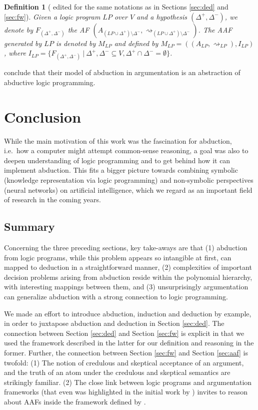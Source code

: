 \documentclass[a4paper]{article}
\newcommand{\attacks}{\rightsquigarrow}
\newtheorem{definition}{Definition}
\begin{document}
\begin{definition}[{\cite[Definition 16]{DBLP:conf/ecai/BoothGKRT14} edited for the same notations as in Sections \ref{sec:ded} and \ref{sec:fw}}]
Given a logic program $LP$ over $V$ and a hypothesis $(\Delta^+, \Delta^-)$, we denote by $F_{(\Delta^+, \Delta^-)}$ the AF $(A_{(LP \cup \Delta^+) \setminus \Delta^-}, \attacks_{(LP \cup \Delta^+) \setminus \Delta^-})$. The AAF \emph{generated by} $LP$ is denoted by $M_{LP}$ and defined by $M_{LP} = ((A_{LP}, \attacks_{LP}), I_{LP})$, where $I_{LP} = \{ F_{(\Delta^+, \Delta^-)} \ | \ \Delta^+, \Delta^- \subseteq V, \Delta^+ \cap \Delta^- = \emptyset \}$.
\end{definition}

\citet{DBLP:conf/ecai/BoothGKRT14} conclude that their model of abduction in argumentation is an abstraction of abductive logic programming.

\section{Conclusion}
\label{sec:con}

While the main motivation of this work was the fascination for abduction, i.e.~how a computer might attempt common-sense reasoning, a goal was also to deepen understanding of logic programming and to get behind how it can implement abduction. This fits a bigger picture towards combining symbolic (knowledge representation via logic programming) and non-symbolic perspectives (neural networks) on artificial intelligence, which we regard as an important field of research in the coming years.

\subsection{Summary}

Concerning the three preceding sections, key take-aways are that (1) abduction from logic programs, while this problem appears so intangible at first, can mapped to deduction in a straightforward manner, (2) complexities of important decision problems arising from abduction reside within the polynomial hierarchy, with interesting mappings between them, and (3) unsurprisingly argumentation can generalize abduction with a strong connection to logic programming.

We made an effort to introduce abduction, induction and deduction by example, in order to juxtapose abduction and deduction in Section \ref{sec:ded}. The connection between Section \ref{sec:ded} and Section \ref{sec:fw} is explicit in that we used the framework described in the latter for our definition and reasoning in the former. Further, the connection between Section \ref{sec:fw} and Section \ref{sec:aaf} is twofold: (1) The notion of credulous and skeptical acceptance of an argument, and the truth of an atom under the credulous and skeptical semantics are strikingly familiar. (2) The close link between logic programs and argumentation frameworks (that even was highlighted in the initial work by \citet{DBLP:journals/ai/Dung95}) invites to reason about AAFs inside the framework defined by \citet{DBLP:journals/tcs/EiterGL97}.
\end{document}
